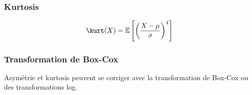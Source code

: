 \begin{frame}
  \frametitle{Kurtosis}


  \[
    \kurt(X) = \mathbb{E} \left[\left(\frac{X - \mu}{\sigma}\right)^4\right]
  \]
\end{frame}

\begin{frame}
  \frametitle{Transformation de Box-Cox}
  Asymétrie et kurtosis peuvent se corriger avec la transformation de
  Box-Cox ou des transformations log.
\end{frame}
